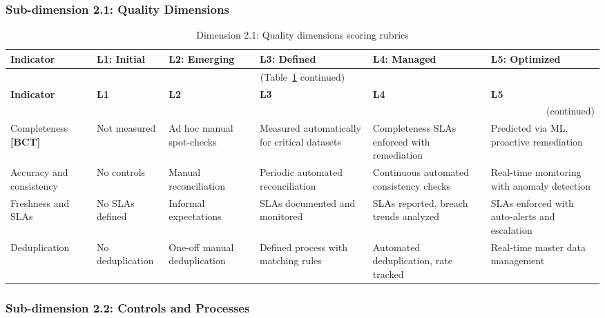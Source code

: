 \subsubsection*{Sub-dimension 2.1: Quality Dimensions}

\begin{center}
{\small
\begin{longtable}{|p{2.4cm}|p{2.0cm}|p{2.0cm}|p{2.2cm}|p{2.2cm}|p{2.2cm}|}
\caption{Dimension 2.1: Quality dimensions scoring rubrics}\label{tab:d2-1}\\

\hline
\textbf{Indicator} & \textbf{L1: Initial} & \textbf{L2: Emerging} & \textbf{L3: Defined} & \textbf{L4: Managed} & \textbf{L5: Optimized} \\
\hline
\endfirsthead
\multicolumn{6}{c}{\small (Table~\ref{tab:d2-1} continued)} \\
\hline
\textbf{Indicator} & \textbf{L1} & \textbf{L2} & \textbf{L3} & \textbf{L4} & \textbf{L5} \\
\hline
\endhead
\hline
\multicolumn{6}{r}{\small (continued)} \\
\endfoot
\hline
\endlastfoot
Completeness \textbf{[BCT]} &
  Not measured &
  Ad hoc manual spot-checks &
  Measured automatically for critical datasets &
  Completeness SLAs enforced with remediation &
  Predicted via ML, proactive remediation \\
\hline
Accuracy and consistency &
  No controls &
  Manual reconciliation &
  Periodic automated reconciliation &
  Continuous automated consistency checks &
  Real-time monitoring with anomaly detection \\
\hline
Freshness and SLAs &
  No SLAs defined &
  Informal expectations &
  SLAs documented and monitored &
  SLAs reported, breach trends analyzed &
  SLAs enforced with auto-alerts and escalation \\
\hline
Deduplication &
  No deduplication &
  One-off manual deduplication &
  Defined process with matching rules &
  Automated deduplication, rate tracked &
  Real-time master data management \\
\hline
\end{longtable}
}
\end{center}

\subsubsection*{Sub-dimension 2.2: Controls and Processes}

